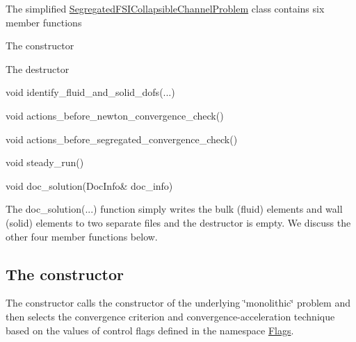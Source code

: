 The simplified {\ttfamily \hyperlink{classSegregatedFSICollapsibleChannelProblem}{Segregated\+F\+S\+I\+Collapsible\+Channel\+Problem}} class contains six member functions
\begin{DoxyItemize}
\item The constructor
\item The destructor
\item {\ttfamily void} {\ttfamily identify\+\_\+fluid\+\_\+and\+\_\+solid\+\_\+dofs}(...)
\item {\ttfamily void} {\ttfamily actions\+\_\+before\+\_\+newton\+\_\+convergence\+\_\+check()} 
\item {\ttfamily void} {\ttfamily actions\+\_\+before\+\_\+segregated\+\_\+convergence\+\_\+check()} 
\item {\ttfamily void} {\ttfamily steady\+\_\+run()} 
\item {\ttfamily void} {\ttfamily doc\+\_\+solution(\+Doc\+Info\& doc\+\_\+info)} 
\end{DoxyItemize}The {\ttfamily doc\+\_\+solution}(...) function simply writes the bulk (fluid) elements and wall (solid) elements to two separate files and the destructor is empty. We discuss the other four member functions below.



\hypertarget{index_constructor}{}\subsection{The constructor}\label{index_constructor}
The constructor calls the constructor of the underlying \char`\"{}monolithic\char`\"{} problem and then selects the convergence criterion and convergence-\/acceleration technique based on the values of control flags defined in the namespace {\ttfamily \hyperlink{namespaceFlags}{Flags}}.

